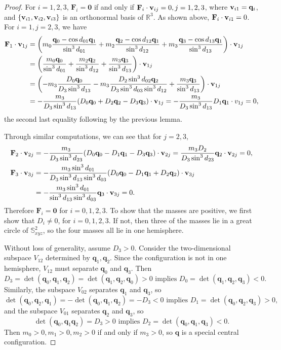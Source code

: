 \documentclass[12pt]{amsart}
\theoremstyle{definition}
\def \mb{\mathbb}
\def \R{\mb R}                 %
\def \S{\mb S}        %
\def\v{{\bf v}}
\newcommand {\q} {\mathbf{q}}
\newcommand {\F} {\mathbf{F}}
\begin{document}
{\begin{proof}
For $i=1,2,3$, $\F_i=\mathbf{0}$ if and only if $\F_i \cdot \v_{ij}=0, j=1,2,3$, where $\v_{i1}=\q_i$, and $\{\v_{i1}, \v_{i2}, \v_{i3}\}$ is an orthonormal basis of $\R^3$. As shown above, $\F_i \cdot \v_{i1}=0$. For $i=1, j=2,3$, we have \begin{align*}
\F_1 \cdot \v_{1j}&=\biggl(m_0\frac{\q_0-\cos{d_{01}}\q_1}{\sin^3{d_{01}}}+m_2\frac{\q_2-\cos{d_{12}}\q_1}{\sin^3{d_{12}}}+m_3\frac{\q_3-\cos{d_{13}}\q_1}{\sin^3{d_{13}}}\biggr) \cdot \v_{1j}\\
&=\biggl(\frac{m_0\q_0}{\sin^3{d_{01}}}+\frac{m_2\q_2}{\sin^3{d_{12}}}+\frac{m_3\q_3}{\sin^3{d_{13}}}\biggr)\cdot \v_{1j}\\
&= \biggl(-m_3\frac{D_0\q_0}{D_3\sin^3{d_{13}}}-m_3\frac{D_2\sin^3{d_{02}}\q_2}{D_3\sin^3{d_{03}}\sin^3{d_{12}}}+\frac{m_3\q_3}{\sin^3{d_{13}}}\biggr) \cdot \v_{1j}\\
&=-\frac{m_3}{D_3\sin^3{d_{13}}}(D_0\q_0+D_2\q_2-D_3\q_3)\cdot \v_{1j}
=-\frac{m_3}{D_3\sin^3{d_{13}}} D_1\q_1\cdot v_{1j}=0,
\end{align*}
the second last equality following by the previous lemma.

Through similar computations, we can see that for $j=2,3$,
\begin{align*}
\F_2\cdot \v_{2j}&=-\frac{m_3}{D_3\sin^3{d_{23}}}(D_0\q_0-D_1\q_1-D_3\q_3)\cdot \v_{2j}=\frac{m_3D_2}{D_3\sin^3{d_{23}}}\q_2 \cdot \v_{2j}=0,\\
\F_3 \cdot \v_{3j}&=-\frac{m_3\sin^3{d_{01}}}{D_3\sin^3{d_{13}}\sin^3{d_{03}}}(D_0\q_0-D_1\q_1+D_2\q_2)\cdot \v_{3j}\\
&=-\frac{m_3\sin^3{d_{01}}}{\sin^3{d_{13}}\sin^3{d_{03}}}\q_3\cdot \v_{3j}=0.\end{align*}
Therefore $\F_i=\mathbf{0}$ for $i=0,1,2,3$.
To show that the masses are positive, we first show that $D_i \neq 0$, for $i=0,1,2,3$. If not, then three of the masses lie in a great circle of $\S^2_{xyz}$, so the four masses all lie in one hemisphere. 
\smallskip

Without loss of generality, assume $D_3>0$. Consider the two-dimensional subspace $V_{12}$ determined by $\q_1, \q_2$. Since the configuration is not in one hemisphere, $V_{12}$ must separate $\q_0$ and $\q_3$. Then $$D_3=\det(\q_0, \q_1, \q_2)=\det(\q_1, \q_2 ,\q_0)>0\text{ implies }D_0=\det(\q_1,\q_2,\q_3)<0.$$
Similarly, the subspace $V_{02}$ separates $\q_1$ and $\q_3$, so $$\det(\q_0, \q_2, \q_1)=-\det(\q_0, \q_1, \q_2)=-D_3<0\text{ implies }D_1=\det(\q_0, \q_2, \q_3)>0,$$
and the subspace $V_{01}$ separates $\q_2$ and $\q_3$, so $$\det(\q_0, \q_1 \q_2)=D_3>0\text{ implies } D_2=\det(\q_0, \q_1, \q_3) <0.$$
Then $m_0>0, m_1>0, m_2>0$ if and only if $m_3>0$, so $\q$ is a special central configuration.
\end{proof}

}
\end{document}
